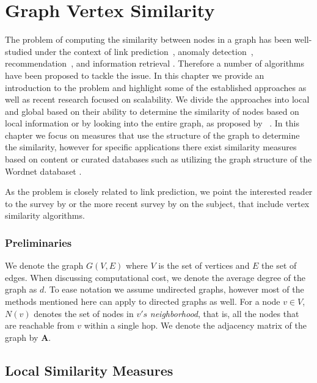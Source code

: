 \chapter{Graph Vertex Similarity}
\label{ch:bg-graph-similarity}

The problem of computing the similarity between nodes in a graph has been
well-studied under the context of link prediction~\cite{link-prediction-survey},
anomaly detection~\cite{graphsim-anomaly},
recommendation~\cite{graphsim-recommendation}, and information retrieval
\cite{graphsim-retrieval}. Therefore a
number of algorithms have been proposed to tackle the issue.
In this chapter we provide an introduction to the problem and
highlight some of the established approaches as well as recent
research focused on scalability. We divide the approaches into local
and global based on their ability to determine the similarity of nodes
based on local information or by looking into the entire graph, as proposed by
~\citet{link-prediction-survey}.
In this chapter we focus on
measures that use the structure of the graph to determine the similarity,
however for specific applications there exist similarity measures
based on content or curated databases such as utilizing the graph
structure of the Wordnet databaset \cite{wordnet-similarity, wordnet-relatedness, wordsim}.

As the problem is closely related to link prediction, we point the interested reader to
the survey by \citet{link-prediction-survey} or the more
recent survey by \citet{link-prediction-survey-2017} on the subject,
that include vertex similarity algorithms.

\subsection*{Preliminaries}


We denote the graph $G(V, E)$ where $V$ is the set of vertices and $E$ the set
of edges. When discussing computational cost, we denote the average degree of the graph as $d$.
To ease notation we assume undirected graphs, however most of the methods
mentioned here can apply to directed graphs as well.
For a node $v \in V$, $N(v)$ denotes the set of nodes in $v's$ \emph{neighborhood},
that is, all the nodes that are reachable from $v$ within a single hop.
We denote the adjacency matrix of the graph by $\mathbf{A}$.


\section{Local Similarity Measures}

